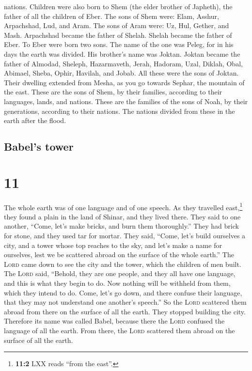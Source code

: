 nations.  Children were also born to Shem (the elder
brother of Japheth), the father of all the children of Eber.
 The sons of Shem were: Elam, Asshur, Arpachshad, Lud,
and Aram.  The sons of Aram were: Uz, Hul, Gether, and
Mash.  Arpachshad became the father of Shelah. Shelah
became the father of Eber.  To Eber were born two sons.
The name of the one was Peleg, for in his days the earth was divided.
His brother's name was Joktan.  Joktan became the father
of Almodad, Sheleph, Hazarmaveth, Jerah,  Hadoram, Uzal,
Diklah,  Obal, Abimael, Sheba,  Ophir,
Havilah, and Jobab. All these were the sons of Joktan. 
Their dwelling extended from Mesha, as you go towards Sephar, the
mountain of the east.  These are the sons of Shem, by
their families, according to their languages, lands, and nations.
 These are the families of the sons of Noah, by their
generations, according to their nations. The nations divided from these
in the earth after the flood.

\hypertarget{babels-tower}{%
\subsection{Babel's tower}\label{babels-tower}}

\hypertarget{section-10}{%
\section{11}\label{section-10}}

 The whole earth was of one language and of one speech.
 As they travelled east,\footnote{\textbf{11:2} LXX reads
  ``from the east''.} they found a plain in the land of Shinar, and they
lived there.  They said to one another, ``Come, let's make
bricks, and burn them thoroughly.'' They had brick for stone, and they
used tar for mortar.  They said, ``Come, let's build
ourselves a city, and a tower whose top reaches to the sky, and let's
make a name for ourselves, lest we be scattered abroad on the surface of
the whole earth.''  The \textsc{Lord} came down to see the
city and the tower, which the children of men built.  The
\textsc{Lord} said, ``Behold, they are one people, and they all have one
language, and this is what they begin to do. Now nothing will be
withheld from them, which they intend to do.  Come, let's
go down, and there confuse their language, that they may not understand
one another's speech.''  So the \textsc{Lord} scattered
them abroad from there on the surface of all the earth. They stopped
building the city.  Therefore its name was called Babel,
because there the \textsc{Lord} confused the language of all the earth.
From there, the \textsc{Lord} scattered them abroad on the surface of
all the earth.

